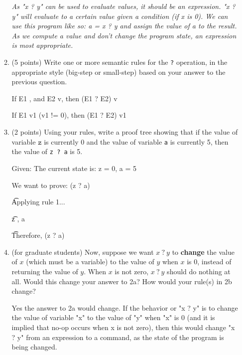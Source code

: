 \documentclass[11pt]{article}
\begin{document}
\begin{enumerate}
\begin{enumerate}
\textit{
As "x ? y" can be used to evaluate values, it should be an expression.  "x ? y" will evaluate to a certain value given a condition (if x is 0).  We can use this program like so: a = x ? y and assign the value of a to the result.  As we compute a value and don't change the program state, an expression is most appropriate.}

\vspace{1in}

\item (5 points) Write one or more semantic rules for the \texttt{?} operation, in the appropriate style (big-step or small-step) based on your answer to the previous question. \newline


If E1 , and E2 \Downarrow v, then (E1 ? E2) \Downarrow v

If E1 \Downarrow v1 (v1 != 0), then (E1 ? E2) \Downarrow v1



\vspace{2.3in}

\item (2 points) Using your rules, write a proof tree showing that if the value of variable $\texttt{z}$ is currently 0 and the value of variable \texttt{a} is currently 5, then the value of \texttt{z ?\ a} is 5. \newline


Given:
The current state is: {z = 0, a = 5}

We want to prove: (z ? a) 

\t Applying rule 1...

\t z  , a 

\t Therefore, (z ? a) 



\vspace{1.8in}


\item (for graduate students) Now, suppose we want $x\ \texttt{?}\ y$ to \textbf{change} the value of $x$ (which must be a variable) to the value of $y$ when $x$ is 0, instead of returning the value of $y$. When $x$ is not zero, $x\ \texttt{?}\ y$ should do nothing at all. Would this change your answer to 2a? How would your rule(s) in 2b change? \newline

Yes the answer to 2a would change.  If the behavior or "x ? y" is to change the value of variable "x" to the value of "y" when "x" is 0 (and it is implied that no-op occurs when x is not zero), then this would change "x ? y" from an expression to a command, as the state of the program is being changed. \newline


\end{enumerate}
\end{enumerate}
\end{document}
